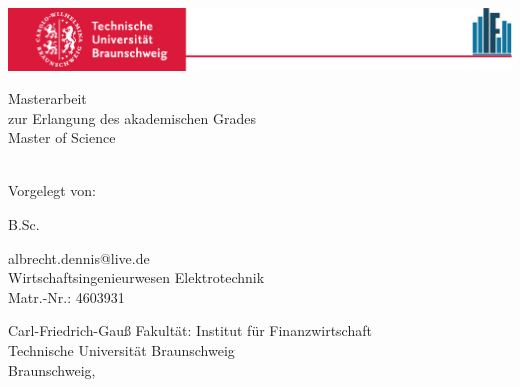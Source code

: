 
\begin{titlepage}
\thispagestyle{empty}
\begin{doublespace}
\centering


\begin{center}
	\includegraphics[width=1.0\textwidth]{Bilder/Offiziell/TUBSIF.pdf}
\end{center}

\vspace{1cm}

\begin{singlespacing}
    {\small Masterarbeit\\zur Erlangung des akademischen Grades\\Master of Science\\ \vspace{2cm}}
\end{singlespacing}


{\huge \textcolor{red}{\textbf{\titel}}}\\ \vspace{2cm}
{\small Vorgelegt von:\\ \vspace{1cm}}

{\Large B.Sc. \name}\\

\begin{singlespacing}
    albrecht.dennis@live.de\\Wirtschaftsingenieurwesen Elektrotechnik\\Matr.-Nr.: 4603931\\
\end{singlespacing}

\vspace{6cm}


\begin{singlespacing}
    Carl-Friedrich-Gauß Fakultät: Institut für Finanzwirtschaft\\Technische Universität Braunschweig\\Braunschweig, \abgabedatum\\
\end{singlespacing}


\end{doublespace}
\end{titlepage}
